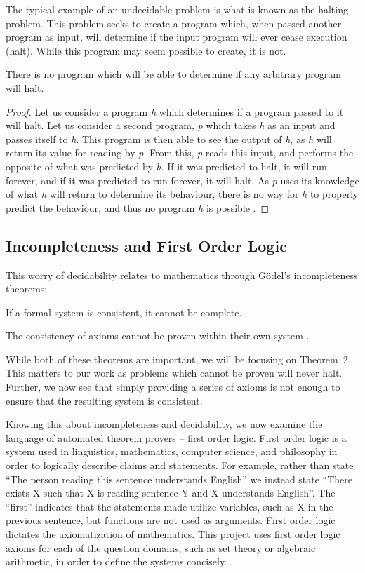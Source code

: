 The typical example of an undecidable problem is what is known as the halting problem. This problem seeks to create a program which, when passed another program as input, will determine if the input program will ever cease execution (halt). While this program may seem possible to create, it is not.

\begin{theorem}
There is no program which will be able to determine if any arbitrary program will halt.
\end{theorem}
\begin{proof}
Let us consider a program \textit{h} which determines if a program passed to it will halt. Let us consider a second program, \textit{p} which takes \textit{h} as an input and passes itself to \textit{h}. This program is then able to see the output of \textit{h}, as \textit{h} will return its value for reading by \textit{p}. From this, \textit{p} reads this input, and performs the opposite of what was predicted by \textit{h}. If it was predicted to halt, it will run forever, and if it was predicted to run forever, it will halt. As \textit{p} uses its knowledge of what \textit{h} will return to determine its behaviour, there is no way for \textit{h} to properly predict the behaviour, and thus no program \textit{h} is possible \cite{haltProof}.
\end{proof}

\subsection{Incompleteness and First Order Logic}\label{incompleteness}
This worry of decidability relates to mathematics through G\"odel's incompleteness theorems:
\begin{theorem}
If a formal system is consistent, it cannot be complete.
\end{theorem}
\begin{theorem}
	The consistency of axioms cannot be proven within their own system \cite{godel}.
\end{theorem}

While both of these theorems are important, we will be focusing on Theorem~2. This matters to our work as problems which cannot be proven will never halt. Further, we now see that simply providing a series of axioms is not enough to ensure that the resulting system is consistent.

Knowing this about incompleteness and decidability, we now examine the language of automated theorem provers -- first order logic. First order logic is a system used in linguistics, mathematics, computer science, and philosophy in order to logically describe claims and statements. For example, rather than state ``The person reading this sentence understands English'' we instead state ``There exists X such that X is reading sentence Y and X understands English''. The ``first'' indicates that the statements made utilize variables, such as X in the previous sentence, but functions are not used as arguments. First order logic dictates the axiomatization of mathematics. This project uses first order logic axioms for each of the question domains, such as set theory or algebraic arithmetic, in order to define the systems concisely.

